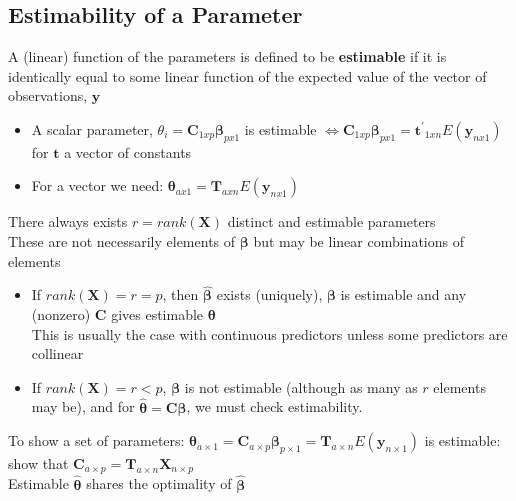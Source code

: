 \documentclass[openany]{book}
\newcommand{\B}{\beta}
\newcommand{\hb}{\hat{\beta}}
\newcommand{\lra}{\Leftrightarrow}
\numberwithin{equation}{section}
\begin{document}
\begin{flushleft}
\section{Estimability of a Parameter}
A (linear) function of the parameters is
defined to be \textbf{estimable} if it is identically equal to some linear function of the expected value of the vector of observations, $\bm{y}$\\
\begin{itemize}
\item A scalar parameter,
$\theta_i=\bm{C}_{1xp}\bm{\B}_{px1}$ is estimable $\lra \bm{C}_{1xp}\bm{\B}_{px1}=\bm{t^{'}}_{1xn}E(\bm{y}_{nx1})$\\
for $\bm{t}$ a vector of constants
\item For a vector we need:
$\bm{\theta}_{ax1}=\bm{T}_{axn}E(\bm{y}_{nx1})$\\
\end{itemize}
There always exists $r=rank(\bm{X})$ distinct and estimable parameters\\
These are not necessarily elements of $\bm{\B}$ but may be linear combinations of elements
\begin{itemize}
\item If $rank(\bm{X})=r=p$, then $\bm{\hb}$ exists (uniquely), 
$\bm{\B}$ is estimable and any (nonzero) $\bm{C}$ gives estimable $\bm{\theta}$\\
This is usually the case with continuous predictors unless some predictors are collinear
\item  If $rank(\bm{X})=r<p$, $\bm{\B}$ is not estimable (although as many as $r$ elements may be), and for $\bm{\hat{\theta}}=\bm{C\B}$, we must check estimability.
\end{itemize}
To show a set of parameters:
$\bm{\theta}_{a\times 1}=\bm{C}_{a\times p}\bm{\B}_{p\times1}=\bm{T}_{a\times n}E(\bm{y}_{n\times 1})$ is estimable:\\
show that $\bm{C}_{a\times p}=\bm{T}_{a\times n}\bm{X}_{n \times p}$\\
Estimable $\bm{\hat{\theta}}$ shares the optimality of $\bm{\hb}$\\

\end{flushleft}
\end{document}

